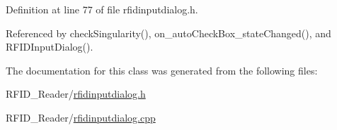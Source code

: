 Definition at line 77 of file rfidinputdialog.h.

Referenced by checkSingularity(), on\_\-autoCheckBox\_\-stateChanged(), and RFIDInputDialog().

The documentation for this class was generated from the following files:\begin{CompactItemize}
\item 
RFID\_\-Reader/\hyperlink{rfidinputdialog_8h}{rfidinputdialog.h}\item 
RFID\_\-Reader/\hyperlink{rfidinputdialog_8cpp}{rfidinputdialog.cpp}\end{CompactItemize}
